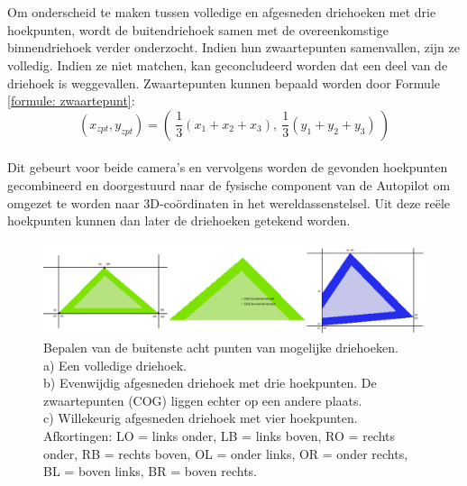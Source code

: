 \\\\
Om onderscheid te maken tussen volledige en afgesneden driehoeken met drie hoekpunten, wordt de buitendriehoek samen met de overeenkomstige binnendriehoek verder onderzocht. Indien hun zwaartepunten samenvallen, zijn ze volledig. Indien ze niet matchen, kan geconcludeerd worden dat een deel van de driehoek is weggevallen. Zwaartepunten kunnen bepaald worden door Formule \ref{formule: zwaartepunt}: \begin{equation}
\label{formule: zwaartepunt}
(x_{zpt},y_{zpt}) = ( \ \frac{1}{3}(x_1 + x_2 + x_3) , \ \frac{1}{3}(y_1 + y_2 + y_3) \ )
\end{equation}
\\
Dit gebeurt voor beide camera's en vervolgens worden de gevonden hoekpunten gecombineerd en doorgestuurd naar de fysische component van de Autopilot om omgezet te worden naar 3D-co\"ordinaten in het wereldassenstelsel. Uit deze re\"ele hoekpunten kunnen dan later de driehoeken getekend worden.
\\
\begin{figure}[H]
	\centering
	\includegraphics[width=1\textwidth]{Scannen/BeeldverwerkingDriehoeken.png}
	\caption{Bepalen van de buitenste acht punten van mogelijke driehoeken. \\ a) Een volledige driehoek. \\ b) Evenwijdig afgesneden driehoek met drie hoekpunten. De zwaartepunten (COG) liggen echter op een andere plaats. \\ c) Willekeurig afgesneden driehoek met vier hoekpunten. \\ 
	Afkortingen: LO = links onder, LB = links boven, RO = rechts onder, RB = rechts boven, OL = onder links, OR = onder rechts, BL = boven links, BR = boven rechts.}
	\label{fig:DrieGevallenDriehoeken}
\end{figure}